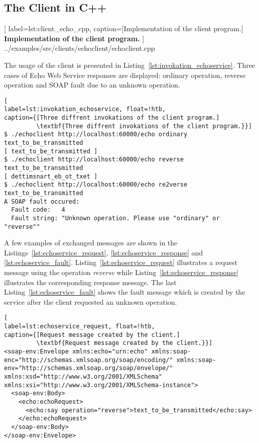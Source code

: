 \subsection{The Client in C++}


	[
	label=lst:client_echo_cpp,
	caption={[Implementation of the client program.]
	\textbf{Implementation of the client program.}}
	]
{../examples/src/clients/echoclient/echoclient.cpp}


The usage of the client is presented in Listing~\ref{lst:invokation_echoservice}.
Three cases of Echo Web Service responses are displayed: ordinary operation, reverse operation and SOAP fault due to an unknown operation.


\begin{lstlisting}[
label=lst:invokation_echoservice, float=!htb,
caption={[Three diffrent invokations of the client program.]
         \textbf{Three diffrent invokations of the client program.}}]
$ ./echoclient http://localhost:60000/echo ordinary text_to_be_transmitted
[ text_to_be_transmitted ]
$ ./echoclient http://localhost:60000/echo reverse text_to_be_transmitted
[ dettimsnart_eb_ot_txet ]
$ ./echoclient http://localhost:60000/echo re2verse text_to_be_transmitted
A SOAP fault occured:
  Fault code:   4
  Fault string: "Unknown operation. Please use "ordinary" or "reverse""
\end{lstlisting}

A few examples of exchanged messages are shown in the Listings~\ref{lst:echoservice_request}, \ref{lst:echoservice_response} and \ref{lst:echoservice_fault}. Listing~\ref{lst:echoservice_request} illustrates a request message using the operation \textit{reverse} while Listing~\ref{lst:echoservice_response} illustrates the corresponding response message.
The last Listing~\ref{lst:echoservice_fault} shows the fault message which is created by the service after the client requested an unknown operation.

\begin{lstlisting}[
label=lst:echoservice_request, float=!htb,
caption={[Request message created by the client.]
         \textbf{Request message created by the client.}}]
<soap-env:Envelope xmlns:echo="urn:echo" xmlns:soap-enc="http://schemas.xmlsoap.org/soap/encoding/" xmlns:soap-env="http://schemas.xmlsoap.org/soap/envelope/" xmlns:xsd="http://www.w3.org/2001/XMLSchema" xmlns:xsi="http://www.w3.org/2001/XMLSchema-instance">
  <soap-env:Body>
    <echo:echoRequest>
      <echo:say operation="reverse">text_to_be_transmitted</echo:say>
    </echo:echoRequest>
  </soap-env:Body>
</soap-env:Envelope>
\end{lstlisting}




